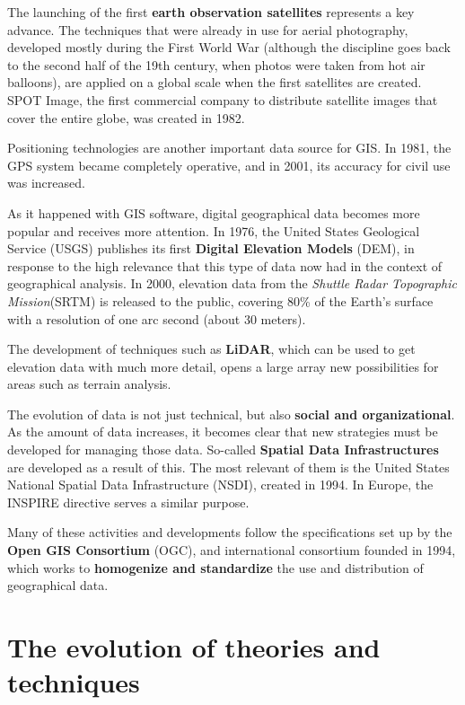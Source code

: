 The launching of the first \textbf{earth observation satellites} represents a key advance. The techniques that were already in use for aerial photography, developed mostly during the First World War (although the discipline goes back to the second half of the 19th century, when photos were taken from hot air balloons), are applied on a global scale when the first satellites are created. SPOT Image, the first commercial company to distribute satellite images that cover the entire globe, was created in 1982.

Positioning technologies are another important data source for GIS. In 1981, the GPS system became completely operative, and in 2001, its accuracy for civil use was increased.

As it happened with GIS software, digital geographical data becomes more popular and receives more attention. In 1976, the United States Geological Service (USGS) publishes its first \textbf{Digital Elevation Models} (DEM), in response to the high relevance that this type of data now had in the context of geographical analysis. In 2000, elevation data from the \emph{Shuttle Radar Topographic Mission}(SRTM) is released to the public, covering 80\% of the Earth's surface with a resolution of one arc second (about 30 meters).

The development of techniques such as \textbf{LiDAR}, which can be used to get elevation data with much more detail, opens a large array new possibilities for areas such as terrain analysis.

The evolution of data is not just technical, but also \textbf{social and organizational}. As the amount of data increases, it becomes clear that new strategies must be developed for managing those data. So-called \textbf{Spatial Data Infrastructures} are developed as a result of this. The most relevant of them is the United States National Spatial Data Infrastructure (NSDI), created in 1994. In Europe, the INSPIRE directive serves a similar purpose.

Many of these activities and developments follow the specifications set up by the \textbf{Open GIS Consortium} (OGC), and international consortium founded in 1994, which works to \textbf{homogenize and standardize} the use and distribution of geographical data.

\section{The evolution of theories and techniques}

